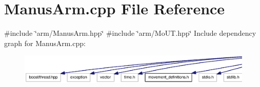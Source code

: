 \section{\-Manus\-Arm.\-cpp \-File \-Reference}
\label{ManusArm_8cpp}
{\ttfamily \#include \char`\"{}arm/\-Manus\-Arm.\-hpp\char`\"{}}\*
{\ttfamily \#include \char`\"{}arm/\-Mo\-U\-T.\-hpp\char`\"{}}\*
\-Include dependency graph for \-Manus\-Arm.\-cpp\-:\nopagebreak
\begin{figure}[H]
\begin{center}
\leavevmode
\includegraphics[width=350pt]{ManusArm_8cpp__incl}
\end{center}
\end{figure}
